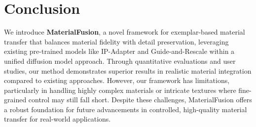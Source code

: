 \section{Conclusion}

We introduce \textbf{MaterialFusion}, a novel framework for exemplar-based material transfer that balances material fidelity with detail preservation, leveraging existing pre-trained models like IP-Adapter and Guide-and-Rescale within a unified diffusion model approach. Through quantitative evaluations and user studies, our method demonstrates superior results in realistic material integration compared to existing approaches. However, our framework has limitations, particularly in handling highly complex materials or intricate textures where fine-grained control may still fall short. Despite these challenges, MaterialFusion offers a robust foundation for future advancements in controlled, high-quality material transfer for real-world applications.

